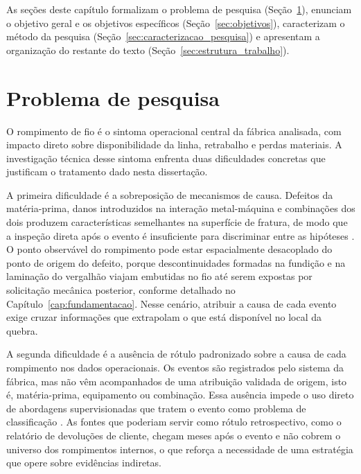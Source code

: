 As seções deste capítulo formalizam o problema de pesquisa (Seção~\ref{sec:problema_pesquisa}), enunciam o objetivo geral e os objetivos específicos (Seção~\ref{sec:objetivos}), caracterizam o método da pesquisa (Seção~\ref{sec:caracterizacao_pesquisa}) e apresentam a organização do restante do texto (Seção~\ref{sec:estrutura_trabalho}).


\section{Problema de pesquisa}
\label{sec:problema_pesquisa}

O rompimento de fio é o sintoma operacional central da fábrica analisada, com impacto direto sobre disponibilidade da linha, retrabalho e perdas materiais. A investigação técnica desse sintoma enfrenta duas dificuldades concretas que justificam o tratamento dado nesta dissertação.

A primeira dificuldade é a sobreposição de mecanismos de causa. Defeitos da matéria-prima, danos introduzidos na interação metal-máquina e combinações dos dois produzem características semelhantes na superfície de fratura, de modo que a inspeção direta após o evento é insuficiente para discriminar entre as hipóteses \cite{karabay2018failure,zasadzinska2022defects}. O ponto observável do rompimento pode estar espacialmente desacoplado do ponto de origem do defeito, porque descontinuidades formadas na fundição e na laminação do vergalhão viajam embutidas no fio até serem expostas por solicitação mecânica posterior, conforme detalhado no Capítulo~\ref{cap:fundamentacao}. Nesse cenário, atribuir a causa de cada evento exige cruzar informações que extrapolam o que está disponível no local da quebra.

A segunda dificuldade é a ausência de rótulo padronizado sobre a causa de cada rompimento nos dados operacionais. Os eventos são registrados pelo sistema da fábrica, mas não vêm acompanhados de uma atribuição validada de origem, isto é, matéria-prima, equipamento ou combinação. Essa ausência impede o uso direto de abordagens supervisionadas que tratem o evento como problema de classificação \cite{chandola2009anomaly}. As fontes que poderiam servir como rótulo retrospectivo, como o relatório de devoluções de cliente, chegam meses após o evento e não cobrem o universo dos rompimentos internos, o que reforça a necessidade de uma estratégia que opere sobre evidências indiretas.


